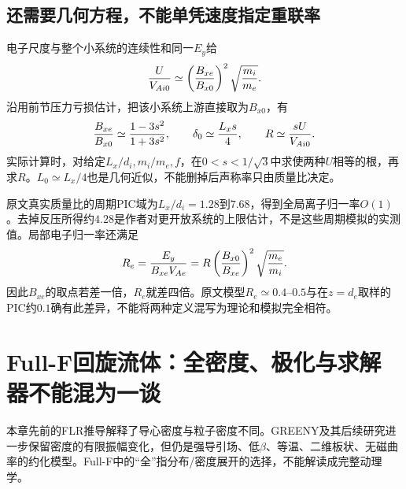 \subsection{还需要几何方程，不能单凭速度指定重联率}
电子尺度与整个小系统的连续性和同一$E_y$给
\begin{equation}
 {U\over V_{Ai0}}\simeq\left({B_{xe}\over B_{x0}}\right)^2
 \sqrt{m_i\over m_e}.
\end{equation}
沿用前节压力亏损估计，把该小系统上游直接取为$B_{x0}$，有
\begin{equation}
 {B_{xe}\over B_{x0}}\simeq{1-3s^2\over1+3s^2},\qquad
 \delta_0\simeq{L_xs\over4},\qquad R\simeq{sU\over V_{Ai0}}.
\end{equation}
实际计算时，对给定$L_x/d_i,m_i/m_e,f$，在$0<s<1/\sqrt3$中求使两种$U$相等的根，再求$R$。$L_0\simeq L_x/4$也是几何近似，不能删掉后声称率只由质量比决定。

原文真实质量比的周期PIC域为$L_x/d_i=1.28$到$7.68$，得到全局离子归一率$O(1)$。去掉反压所得约$4.28$是作者对更开放系统的上限估计，不是这些周期模拟的实测值。局部电子归一率还满足
\begin{equation}
 R_e={E_y\over B_{xe}V_{Ae}}
 =R\left({B_{x0}\over B_{xe}}\right)^2\sqrt{m_e\over m_i}.
\end{equation}
因此$B_{xe}$的取点若差一倍，$R_e$就差四倍。原文模型$R_e\simeq0.4$--$0.5$与在$z=d_e$取样的PIC约$0.1$确有此差异，不能将两种定义混写为理论和模拟完全相符。

\section{Full-F回旋流体：全密度、极化与求解器不能混为一谈}
\label{sec:remaining-fullf}
本章先前的FLR推导解释了导心密度与粒子密度不同。GREENY及其后续研究\citep{E473,L314}进一步保留密度的有限振幅变化，但仍是强导引场、低$\beta$、等温、二维板状、无磁曲率的约化模型。Full-F中的“全”指分布/密度展开的选择，不能解读成完整动理学。


